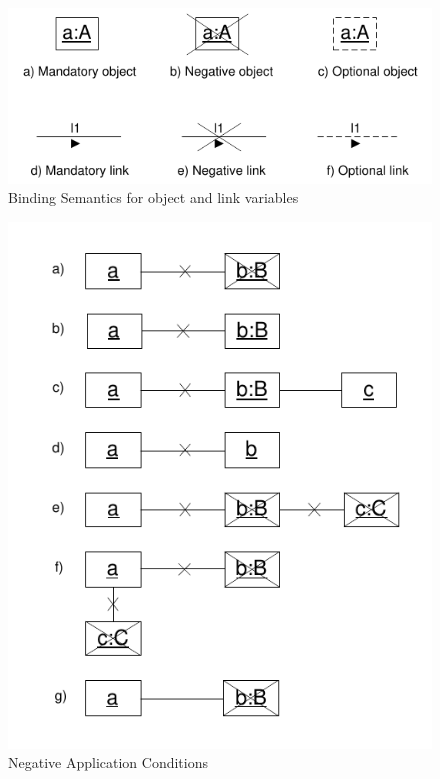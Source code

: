 \begin{figure}[htbp]
  \centering
  \includegraphics[scale=1.2]{figures/BindingSemanticsOverview}
  \caption{Binding Semantics for object and link variables}
  \label{fig:bindingSemanticsOverview}
\end{figure}

\begin{figure}[htbp]
  \centering
  \includegraphics[scale=1]{figures/negativeObjects}
  \caption{Negative Application Conditions}
  \label{fig:negativeObjects}
\end{figure}

